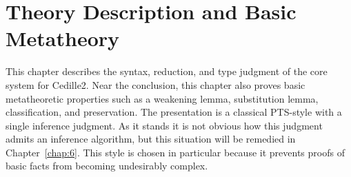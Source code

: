 \chapter{Theory Description and Basic Metatheory}


This chapter describes the syntax, reduction, and type judgment of the core system for Cedille2.
Near the conclusion, this chapter also proves basic metatheoretic properties such as a weakening lemma, substitution lemma, classification, and preservation.
The presentation is a classical PTS-style with a single inference judgment.
As it stands it is not obvious how this judgment admits an inference algorithm, but this situation will be remedied in Chapter~\ref{chap:6}.
This style is chosen in particular because it prevents proofs of basic facts from becoming undesirably complex.


%


%

